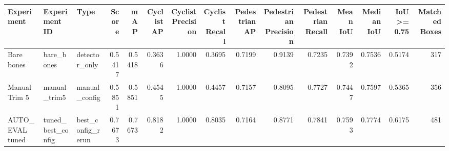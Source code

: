 \begin{tabular}{lllrrrrrrrrrrrr}
\toprule
Experiment & Experiment ID & Type & Score & mAP & Cyclist AP & Cyclist Precision & Cyclist Recall & Pedestrian AP & Pedestrian Precision & Pedestrian Recall & Mean IoU & Median IoU & IoU >= 0.75 & Matched Boxes \\
\midrule
Bare bones & bare_bones & detector_only & 0.5417 & 0.5418 & 0.3636 & 1.0000 & 0.3695 & 0.7199 & 0.9139 & 0.7235 & 0.7392 & 0.7536 & 0.5174 & 317 \\
Manual Trim 5 & manual_trim5 & manual_config & 0.5851 & 0.5851 & 0.4545 & 1.0000 & 0.4457 & 0.7157 & 0.8095 & 0.7727 & 0.7447 & 0.7597 & 0.5365 & 356 \\
AUTO_EVAL tuned & tuned_best_config & best_config_rerun & 0.7673 & 0.7673 & 0.8182 & 1.0000 & 0.8035 & 0.7164 & 0.8771 & 0.7841 & 0.7593 & 0.7774 & 0.6175 & 481 \\
\bottomrule
\end{tabular}

